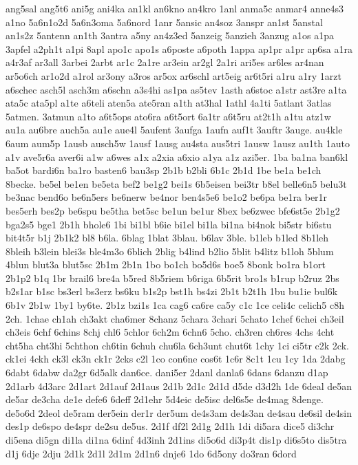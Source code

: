 {ang5sal
ang5t6
ani5g
ani4ka
an1kl
an6kno
an4kro
1anl
anma5c
anmar4
anne4s3
a1no
5a6n1o2d
5a6n3oma
5a6nord
1anr
5ansic
an4soz
3anspr
an1st
5anstal
an1s2z
5antenn
an1th
3antra
a5ny
an4z3ed
5anzeig
5anzieh
3anzug
a1os
a1pa
3apfel
a2ph1t
a1pi
8apl
apo1c
apo1s
a6poste
a6poth
1appa
ap1pr
a1pr
ap6sa
a1ra
a4r3af
ar3all
3arbei
2arbt
ar1c
2a1re
ar3ein
ar2gl
2a1ri
ari5es
ar6les
ar4nan
ar5o6ch
ar1o2d
a1rol
ar3ony
a3ros
ar5ox
ar6schl
art5eig
ar6t5ri
a1ru
a1ry
1arzt
a6schec
asch5l
asch3m
a6schn
a3s4hi
as1pa
as5tev
1asth
a6stoc
a1str
ast3re
a1ta
ata5c
ata5pl
a1te
a6teli
aten5a
ate5ran
a1th
at3hal
1athl
4a1ti
5atlant
3atlas
5atmen.
3atmun
a1to
a6t5ops
ato6ra
a6t5ort
6a1tr
a6t5ru
at2t1h
a1tu
atz1w
au1a
au6bre
auch5a
au1e
aue4l
5aufent
3aufga
1aufn
auf1t
3auftr
3auge.
au4kle
6aum
aum5p
1ausb
ausch5w
1ausf
1ausg
au4sta
aus5tri
1ausw
1ausz
au1th
1auto
a1v
ave5r6a
aver6i
a1w
a6wes
a1x
a2xia
a6xio
a1ya
a1z
azi5er.
1ba
ba1na
ban6kl
ba5ot
bardi6n
ba1ro
basten6
bau3sp
2b1b
b2bli
6b1c
2b1d
1be
be1a
be1ch
8becke.
be5el
be1en
be5eta
bef2
be1g2
bei1s
6b5eisen
bei3tr
b8el
belle6n5
belu3t
be3nac
bend6o
be6n5ers
be6nerw
be4nor
ben4s5e6
be1o2
be6pa
be1ra
ber1r
bes5erh
bes2p
be6spu
be5tha
bet5sc
be1un
be1ur
8bex
be6zwec
bfe6st5e
2b1g2
bga2s5
bge1
2b1h
bhole6
1bi
bi1bl
b6ie
bi1el
bi1la
bi1na
bi4nok
bi5str
bi6stu
bit4t5r
b1j
2b1k2
bl8
b6la.
6blag
1blat
3blau.
b6lav
3ble.
b1leb
b1led
8b1leh
8bleih
b3lein
blei3s
ble4m3o
6blich
2blig
b4lind
b2lio
5blit
b4litz
b1loh
5blum
4blun
blut3a
blut5sc
2b1m
2b1n
1bo
bo1ch
bo5d6s
boe5
8bonk
bo1ra
b1ort
2b1p2
b1q
1br
brail6
bre4a
b5red
8b5riem
b6riga
6b5rit
bro1s
b1rup
b2ruz
2bs
b2s1ar
b1sc
bs3erl
bs3erz
bs6ku
b1s2p
bst1h
bs4zi
2b1t
b2t1h
1bu
bu1ie
bul6k
6b1v
2b1w
1by1
by6te.
2b1z
bzi1s
1ca
cag6
ca6re
ca5y
c1c
1ce
celi4c
celich5
c8h
2ch.
1chae
ch1ah
ch3akt
cha6mer
8chanz
5chara
3chari
5chato
1chef
6chei
ch3eil
ch3eis
6chf
6chins
8chj
chl6
5chlor
6ch2m
6chn6
5cho.
ch3ren
ch6res
4chs
4cht
cht5ha
cht3hi
5chthon
ch6tin
6chuh
chu6la
6ch3unt
chut6t
1chy
1ci
ci5tr
c2k
2ck.
ck1ei
4ckh
ck3l
ck3n
ck1r
2cks
c2l
1co
con6ne
cos6t
1c6r
8c1t
1cu
1cy
1da
2dabg
6dabt
6dabw
da2gr
6d5alk
dan6ce.
dani5er
2danl
danla6
6dans
6danzu
d1ap
2d1arb
4d3arc
2d1art
2d1auf
2d1aus
2d1b
2d1c
2d1d
d5de
d3d2h
1de
6deal
de5an
de5ar
de3cha
de1e
defe6
6deff
2d1ehr
5d4eic
de5isc
del6s5e
de4mag
8denge.
de5o6d
2deol
de5ram
der5ein
der1r
der5um
de4s3am
de4s3an
de4sau
de6sil
de4sin
des1p
de6spo
de4spr
de2su
de5us.
2d1f
df2l
2d1g
2d1h
1di
di5ara
dice5
di3chr
di5ena
di5gn
di1la
di1na
6dinf
4d3inh
2d1ins
di5o6d
di3p4t
dis1p
di6s5to
dis5tra
d1j
6dje
2dju
2d1k
2d1l
2d1m
2d1n6
dnje6
1do
6d5ony
do3ran
6dord
}
